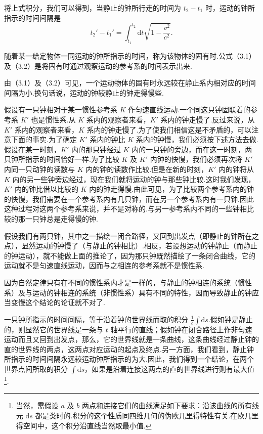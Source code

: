 将上式积分，我们可以得到，当静止的钟所行走的时间为 $t_2-t_1$ 时，运动的钟所指示的时间间隔是
\begin{equation}
  t_2'-t_1'=\int_{t_1}^{t_2}\mathrm{d}t\sqrt{1-\frac{v^2}{c^2}}.
\end{equation}

随着某一给定物体一同运动的钟所指示的时间，称为该物体的固有时.公式（3.1）及（3.2）是将固有时通过观察运动的参考系的时间表示出来.

由（3.1）及（3.2）可见，一个运动物体的固有时永远较在静止系内相对应的时间间隔为小.换句话说，运动的钟较静止的钟走得慢些.

假设有一只钟相对于某一惯性参考系 $K$ 作匀速直线运动.一个同这只钟固联着的参考系 $K'$ 也是惯性系.从 $K$ 系内的观察者来看，$K'$ 系内的钟走慢了.反过来说，从 $K'$ 系内的观察者来看，$K$ 系内的钟走慢了.为了使我们相信这是不矛盾的，可以注意下面的事实.为了确定 $K'$ 系内的钟比 $K$ 系内的钟慢，我们必须按下述方法去做.假设在某一时刻，$K'$ 内的那只钟经过 $K$ 内的一只钟的旁边，而在这一时刻，两只钟所指示的时间恰好一样.为了比较 $K$ 及 $K'$ 内钟的快慢，我们必须再次将 $K'$ 内同一只动钟的读数与 $K$ 内的钟的读数作比较.但是在新的时刻，$K'$ 内的钟将从 $K$ 内的另一些钟旁边经过，现在我们就将运动的钟与那些钟比较.这时我们发现，$K'$ 内的钟比借以比较的 $K$ 内的钟走得慢.由此可见，为了比较两个参考系内的钟的快慢，我们需要在一个参考系内有几只钟，而在另一个参考系内有一只钟.因此这种过程对这两个参考系来说，并不是对称的.与另一参考系内不同的一些钟相比较的那一只钟总是走得慢的钟.

假设我们有两只钟，其中之一描绘一闭合路径，又回到出发点（即静止的钟所在之点），显然运动的钟慢了（与静止的钟相比）.相反，若设想运动的钟静止（而静止的钟运动），就不能做上面的推论了，因为那只钟既然描绘了一条闭合曲线，它的运动就不是匀速直线运动，因而与之相连的参考系就不是惯性系.

因为自然定律只有在不同的惯性系内才是一样的，与静止的钟相连的系统（惯性系）及与运动的钟相连的系统（非惯性系）具有不同的特性，因而导致静止的钟应当变慢这个结论的论证就不对了.

一只钟所指示的时间间隔，等于沿着钟的世界线而取的积分 $\frac{1}{c}\int\mathrm{d}s$.假如钟是静止的，则显然它的世界线是一条与 $t$ 轴平行的直线；假如钟在闭合路径上作非匀速运动而且又回到出发点，那么，它的世界线就是一条曲线，这条曲线经过静止钟的直的世界线的两点，这两点对应运动的起点及终点.另一方面，我们看到，静止钟所指示的时间间隔永远较运动钟所指示的为大.因此，我们得到一个结论，在两个世界点间所取的积分 $\int\mathrm{d}s$，如果是沿着连接这两点的直的世界线进行则有最大值\footnote{当然，需假设 $a$ 及 $b$ 两点和连接它们的曲线满足如下要求：沿该曲线的所有线元 $\mathrm{d}s$ 都是类时的.积分的这个性质同四维几何的伪欧几里得特性有关.在欧几里得空间中，这个积分沿直线当然取最小值.}.

